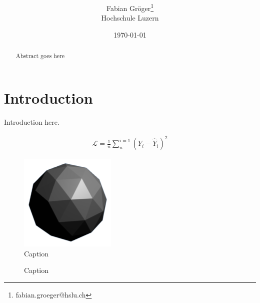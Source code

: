 \documentclass[onecolumn]{article}
\title{\spacecaps{Lab report: SW01 }\\ \normalsize \spacesc{TSM\_AnTeDe} }
\author{Fabian Gröger\thanks{fabian.groeger@hslu.ch}\\Hochschule Luzern}
\date{\today}
\begin{document}
\maketitle

\begin{abstract}
Abstract goes here
\end{abstract}

\section{Introduction}
Introduction here.

\begin{align}
	\mathcal{L} = \frac{1}{n}\sum_n^{i=1} (Y_i - \hat{Y}_i)^2
\end{align}

\begin{figure}[t]
\centering
    \includegraphics[width=.3\linewidth]{fig/flat.png}
\caption{\label{fig:demo-bad}
Caption}
\end{figure}

\begin{figure}[t]
\centering
{}
\caption{\label{fig:demo} 
Caption}
\end{figure}

\nocite{*}


\end{document}
